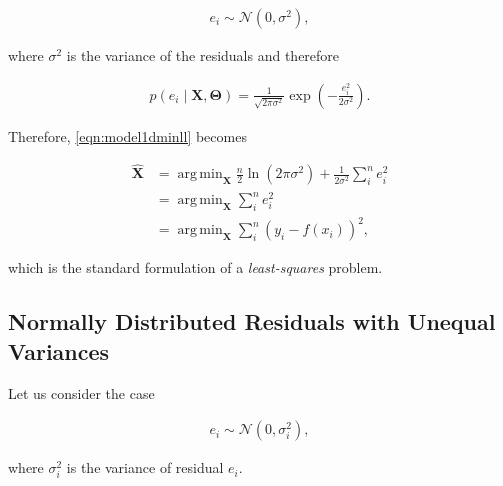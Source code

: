 \documentclass[12pt]{article}
\DeclareMathOperator*{\argmin}{arg\,min}
\begin{document}
      \begin{equation}\label{eqn:model1dnormresidualssim}
        \begin{aligned}
        e_i \sim \mathcal{N}(0, \sigma^2),
        \end{aligned}
      \end{equation}

      \noindent where $\sigma^2$ is the variance of the residuals and therefore

      \begin{equation}\label{eqn:model1dnormresidualspdf}
        \begin{aligned}
        p(e_i\mid\mathbf{X},\boldsymbol{\Theta}) = \frac{1}{\sqrt{2\pi\sigma^2}}
          \exp(-\frac{e_i^2}{2\sigma^2}).
        \end{aligned}
      \end{equation}

      Therefore, \eqref{eqn:model1dminll} becomes

      \begin{equation}\label{eqn:model1dminllnorm}
        \begin{aligned}
        \mathbf{\hat{X}} &=
          \argmin_{\mathbf{X}}\frac{n}{2}\ln(2\pi\sigma^2) +
          \frac{1}{2\sigma^2}\sum_i^n e_i^2 \\&=
        \argmin_{\mathbf{X}}\sum_i^n e_i^2 \\&=
        \argmin_{\mathbf{X}}\sum_i^n (y_i-f(x_i))^2,
        \end{aligned}
      \end{equation}

      \noindent which is the standard formulation of a \emph{least-squares}
      problem.

    \subsection{Normally Distributed Residuals with Unequal Variances}

      Let us consider the case

      \begin{equation}\label{eqn:model1dnormresidualssim2}
        \begin{aligned}
        e_i \sim \mathcal{N}(0, \sigma_i^2),
        \end{aligned}
      \end{equation}

      \noindent where $\sigma_i^2$ is the variance of residual $e_i$.
\end{document}
